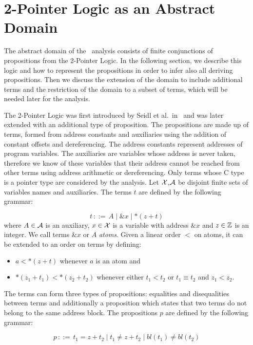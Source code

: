 \chapter{2-Pointer Logic as an Abstract Domain}\label{chapter:2pointer}

The abstract domain of the \cpo\ analysis consists of finite conjunctions of propositions from the 2-Pointer Logic.
In the following section, we describe this logic and how to represent the propositions in order to
infer also all deriving propositions.
Then we discuss the extension of the domain to include additional terms and the restriction of the domain to a subset of terms,
which will be needed later for the analysis.

The 2-Pointer Logic was first introduced by Seidl et al.\ in~\cite{2pointer} and was later extended with an additional type of proposition.
The propositions are made up of terms, formed from address constants and auxiliaries using the addition of constant offsets and dereferencing.
The address constants represent addresses of program variables.
The auxiliaries are variables whose address is never taken, therefore
we know of these variables that their address cannot be reached from other terms using address arithmetic or dereferencing.
Only terms whose C type is a pointer type are considered by the analysis.
Let $\mathcal{X}$,$\mathcal{A}$ be disjoint finite sets of variables names and auxiliaries.
The terms $t$ are defined by the following grammar:

\[
    t\,{::=}\,A \mid \&x \mid *(z+t)
\]
where $A\in \mathcal{A}$ is an auxiliary, $x \in \mathcal{X}$ is a variable with address $\&x$ and $z \in \mathbb{Z}$ is an integer.
We call terms $\&x$ or $A$ \emph{atoms}.
Given a linear order $<$ on atoms, it can be extended to an order on terms by defining:
\begin{itemize}
    \item $a < *(z+t)$ whenever $a$ is an atom and
    \item $*(z_1 + t_1) < *(z_2 + t_2)$ whenever either $t_1 < t_2$ or $t_1 \equiv t_2$ and $z_1 < z_2$.
\end{itemize}

The terms can form three types of propositions: equalities and disequalities between terms and additionally a proposition which states that two terms do not belong to the same address block.
The propositions $p$ are defined by the following grammar:

\[
    p\,{::=}\,t_1=z+t_2 \mid t_1\neq z+t_2\mid bl(t_1) \neq bl(t_2)
\]

